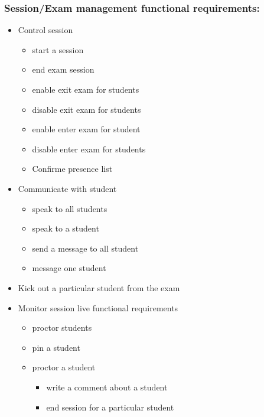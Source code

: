 \documentclass[a4paper,12p]{article}
\begin{document}
     \subsubsection{Session/Exam management functional requirements:}
     \begin{itemize}
         \item Control session
         \begin{itemize}
             \item start a session
             \item end exam session
             \item enable exit exam for students
             \item disable exit exam for students
             \item enable enter exam for student
             \item disable enter exam for students
             \item Confirme presence list
         \end{itemize}
         \item Communicate with student
         \begin{itemize}
             \item speak to all students
             \item speak to a student
             \item send a message to all student
             \item message one student
         \end{itemize}
         \item Kick out a particular student from the exam
         \item Monitor session live functional requirements
         \begin{itemize}
             \item proctor students
             \item pin a student
             \item proctor a student
             \begin{itemize}
                 \item write a comment about a student
                 \item end session for a particular student
             \end{itemize}
         \end{itemize}
     \end{itemize}
\end{document}
